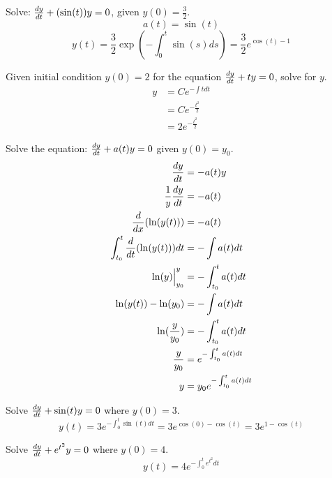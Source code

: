 \documentclass[12pt]{article}
\begin{document}
\begin{example} Solve: $\frac{dy}{dt} + (\sin(t))y = 0$, given $y(0) = \frac{3}{2} $. 
$$a(t) = \sin(t) $$ $$y(t) = \frac{3}{2}\exp(-\int_0^t \sin(s)ds) = \frac{3}{2}e^{\cos(t) - 1}$$ \end{example}
\begin{example} Given initial condition $y(0) = 2$ for the equation $\frac{dy}{dt} + ty = 0$, solve for $y$. $$\begin{aligned} y &= Ce^{-\int tdt} \\ &= Ce^{-\frac{t^2}{2}} \\ &= 2e^{-\frac{t^2}{2}} \end{aligned} $$ \end{example} 
\begin{example} Solve the equation: $\frac{dy}{dt} + a(t)y = 0$ given $y(0) = y_0$. 
$$ \begin{aligned} \frac{dy}{dt} &= -a(t)y \\ \frac{1}{y}\frac{dy}{dt} &= -a(t) \\ \frac{d}{dx}(\ln(y(t))) &= -a(t) \\ \int_{t_0}^t \frac{d}{dt}(\ln(y(t))) dt &= -\int a(t) dt \\ \ln(y)\Big|_{y_0}^y &= -\int_{t_0}^t a(t) dt \\ \ln(y(t)) - \ln(y_0) &= -\int a(t) dt \\ 
\ln(\frac{y}{y_0}) &= -\int_{t_0}^t a(t)dt \\ \frac{y}{y_0} &= e^{-\int_{t_0}^t a(t) dt} \\ y &= y_0e^{-\int_{t_0}^t a(t) dt} \end{aligned} $$ \end{example}
\begin{example} Solve $\frac{dy}{dt} + \sin(t)y = 0$ where $y(0) = 3$. 
$$y(t) = 3e^{-\int_0^t \sin(t) dt} = 3e^{\cos(0) - \cos(t)} = 3e^{1 - \cos(t)} $$ \end{example} 
\begin{example} Solve $\frac{dy}{dt} + e^{t^2}y = 0$ where $y(0) = 4$. 
$$y(t) = 4e^{-\int_0^t e^{t^2} dt} $$ \end{example} 
\end{document}
